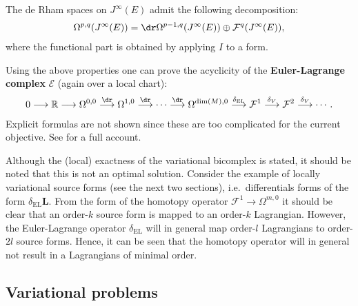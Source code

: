     \begin{result}\label{var:functional_decomposition}
        The de Rham spaces on $J^\infty(E)$ admit the following decomposition:
        \begin{gather}
            \Omega^{p,q}(J^\infty(E)) = \dr\Omega^{p-1,q}(J^\infty(E))\oplus\mathcal{F}^q(J^\infty(E)),
        \end{gather}
        where the functional part is obtained by applying $I$ to a form.
    \end{result}

    Using the above properties one can prove the acyclicity of the \textbf{Euler-Lagrange complex} $\mathcal{E}$ (again over a local chart):
    \begin{gather}
        0\longrightarrow\mathbb{R}\longrightarrow\Omega^{0,0}\overset{\dr}{\longrightarrow}\Omega^{1,0}\overset{\dr}{\longrightarrow}\cdots\overset{\dr}{\longrightarrow}\Omega^{\dim(M),0}\overset{\delta_\mathrm{EL}}{\longrightarrow}\mathcal{F}^1\overset{\delta_V}{\longrightarrow}\mathcal{F}^2\overset{\delta_V}{\longrightarrow}\cdots.
    \end{gather}
    Explicit formulas are not shown since these are too complicated for the current objective. See \cite{var_bicomplex} for a full account.

    \begin{remark}
        Although the (local) exactness of the variational bicomplex is stated, it should be noted that this is not an optimal solution. Consider the example of locally variational source forms (see the next two sections), i.e.~differentials forms of the form $\delta_\mathrm{EL}\mathbf{L}$. From the form of the homotopy operator $\mathcal{F}^1\rightarrow\Omega^{m,0}$ it should be clear that an order-$k$ source form is mapped to an order-$k$ Lagrangian. However, the Euler-Lagrange operator $\delta_\mathrm{EL}$ will in general map order-$l$ Lagrangians to order-$2l$ source forms. Hence, it can be seen that the homotopy operator will in general not result in a Lagrangians of minimal order.
    \end{remark}

\subsection{Variational problems}


